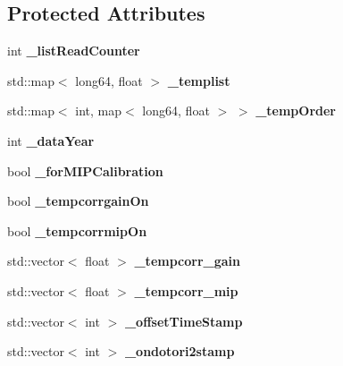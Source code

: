 \subsection*{Protected Attributes}
\begin{DoxyCompactItemize}
\item 
int {\bfseries \_\-listReadCounter}\label{classCALICE_1_1IntegratedScECALCalibrationProcessor_aa242bf8b17ea06ba0c3a29651ccf03c7}

\item 
std::map$<$ long64, float $>$ {\bfseries \_\-templist}\label{classCALICE_1_1IntegratedScECALCalibrationProcessor_ad97e4e34867d7fa28a1eb07ea6220af7}

\item 
std::map$<$ int, map$<$ long64, float $>$ $>$ {\bfseries \_\-tempOrder}\label{classCALICE_1_1IntegratedScECALCalibrationProcessor_af562fe94a00b1e2a214d23dfc6046082}

\item 
int {\bfseries \_\-dataYear}\label{classCALICE_1_1IntegratedScECALCalibrationProcessor_adabbfd2f9d989e06a31acf5df9404018}

\item 
bool {\bfseries \_\-forMIPCalibration}\label{classCALICE_1_1IntegratedScECALCalibrationProcessor_a5954f01e887988d58dfb4d0c449f671a}

\item 
bool {\bfseries \_\-tempcorrgainOn}\label{classCALICE_1_1IntegratedScECALCalibrationProcessor_a5b2f5d0be9d2564c1f26136dc19c2812}

\item 
bool {\bfseries \_\-tempcorrmipOn}\label{classCALICE_1_1IntegratedScECALCalibrationProcessor_a26685b20a13b1ec113ed710f5066f3da}

\item 
std::vector$<$ float $>$ {\bfseries \_\-tempcorr\_\-gain}\label{classCALICE_1_1IntegratedScECALCalibrationProcessor_a6bea424148f94a17f5b1bcaa9560b4f1}

\item 
std::vector$<$ float $>$ {\bfseries \_\-tempcorr\_\-mip}\label{classCALICE_1_1IntegratedScECALCalibrationProcessor_a96a833648299a5ac4ab5e961e5ce5425}

\item 
std::vector$<$ int $>$ {\bfseries \_\-offsetTimeStamp}\label{classCALICE_1_1IntegratedScECALCalibrationProcessor_a8156f18fe252c98f723382db01ce9d80}

\item 
std::vector$<$ int $>$ {\bfseries \_\-ondotori2stamp}\label{classCALICE_1_1IntegratedScECALCalibrationProcessor_a8a2a540275a5de1c440ea6389f549868}


\end{DoxyCompactItemize}

